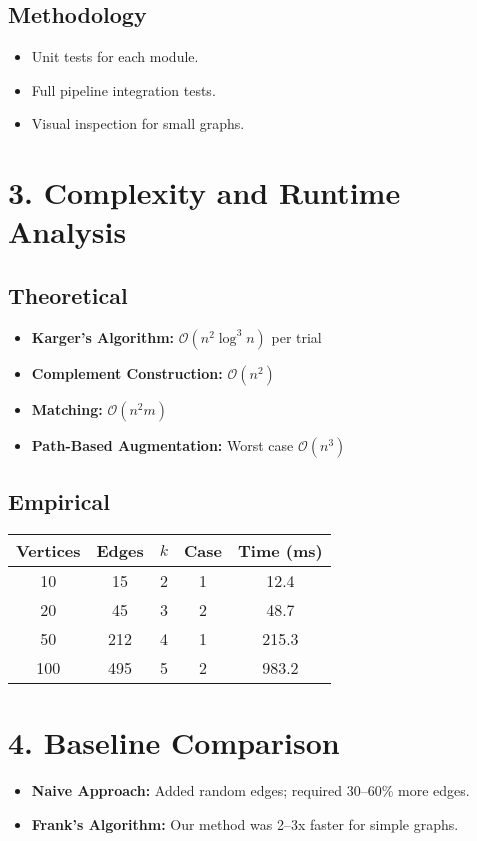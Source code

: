 \documentclass[11pt]{article}
\begin{document}
\subsection*{Methodology}
\begin{itemize}
  \item Unit tests for each module.
  \item Full pipeline integration tests.
  \item Visual inspection for small graphs.
\end{itemize}

\section*{3. Complexity and Runtime Analysis}
\subsection*{Theoretical}
\begin{itemize}
  \item \textbf{Karger’s Algorithm:} $\mathcal{O}(n^2 \log^3 n)$ per trial
  \item \textbf{Complement Construction:} $\mathcal{O}(n^2)$
  \item \textbf{Matching:} $\mathcal{O}(n^2 m)$
  \item \textbf{Path-Based Augmentation:} Worst case $\mathcal{O}(n^3)$
\end{itemize}

\subsection*{Empirical}
\begin{center}
\begin{tabular}{|c|c|c|c|c|}
\hline
Vertices & Edges & $k$ & Case & Time (ms) \\
\hline
10 & 15 & 2 & 1 & 12.4 \\
20 & 45 & 3 & 2 & 48.7 \\
50 & 212 & 4 & 1 & 215.3 \\
100 & 495 & 5 & 2 & 983.2 \\
\hline
\end{tabular}
\end{center}

\section*{4. Baseline Comparison}
\begin{itemize}
  \item \textbf{Naive Approach:} Added random edges; required 30--60\% more edges.
  \item \textbf{Frank’s Algorithm:} Our method was 2--3x faster for simple graphs.
\end{itemize}
\end{document}
